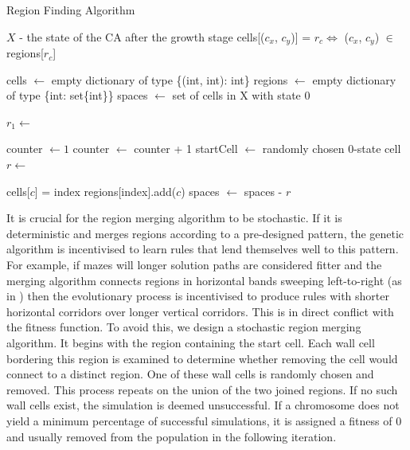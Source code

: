 \begin{algorithm}
  \caption{Region Finding Algorithm}\label{alg:region-find}
  \begin{algorithmic}
  \Require $X$ - the state of the CA after the growth stage
  \Ensure cells[($c_x$, $c_y$)] = $r_c \iff$ ($c_x$, $c_y$) $\in$ regions[$r_c$]

  \State cells $\gets$ empty dictionary of type \{(int, int): int\}
  \State regions $\gets$ empty dictionary of type \{int: set\{int\}\}
  \State spaces $\gets$ set of cells in X with state 0

  \State $r_1 \gets$ 
  \State {}
  
  
  \State counter $\gets 1$
    \State counter $\gets$ counter + 1
    \State startCell $\gets$ randomly chosen 0-state cell
    \State $r \gets$ 
    \State {}
  \EndWhile

        \State cells[$c$] = index
        \State regions[index].add($c$)
    \EndFor
    \State spaces $\gets$ spaces - $r$
  \EndProcedure
  \end{algorithmic}
\end{algorithm}

It is crucial for the region merging algorithm to be stochastic. If it is deterministic and merges regions according to a pre-designed pattern, the genetic algorithm is incentivised to learn rules that lend themselves well to this pattern. For example, if mazes will longer solution paths are considered fitter and the merging algorithm connects regions in horizontal bands sweeping left-to-right (as in \cite{adams2018evolving}) then the evolutionary process is incentivised to produce rules with shorter horizontal corridors over longer vertical corridors. This is in direct conflict with the fitness function. To avoid this, we design a stochastic region merging algorithm. It begins with the region containing the start cell. Each wall cell bordering this region is examined to determine whether removing the cell would connect to a distinct region. One of these wall cells is randomly chosen and removed. This process repeats on the union of the two joined regions. If no such wall cells exist, the simulation is deemed unsuccessful. If a chromosome does not yield a minimum percentage of successful simulations, it is assigned a fitness of 0 and usually removed from the population in the following iteration.\\


